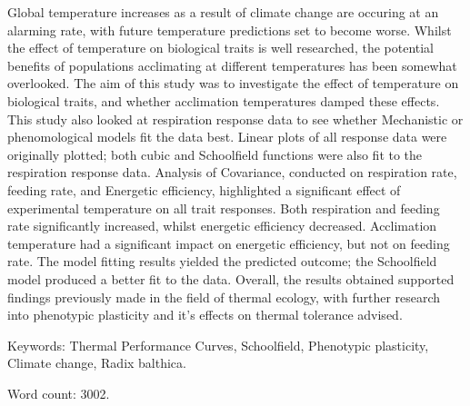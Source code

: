 \documentclass[../../Paper.tex]{subfiles}
\begin{document}
Global temperature increases as a result of climate change are occuring 
at an alarming rate, with future temperature predictions set
to become worse. Whilst the effect of temperature on biological
traits is well researched, the potential benefits of populations acclimating at different temperatures 
has been somewhat overlooked. The aim of this study was
to investigate the effect of temperature on biological traits,
and whether acclimation temperatures damped these effects.
This study also looked at respiration response data to see whether Mechanistic or
phenomological models fit the data best. Linear plots of all 
response data were originally plotted; both cubic and Schoolfield
functions were also fit to the respiration response
data. Analysis of Covariance, conducted on respiration rate, feeding rate, and
Energetic efficiency, highlighted a significant effect of experimental temperature
on all trait responses. Both respiration and feeding rate significantly increased, whilst energetic efficiency
decreased. Acclimation temperature had a significant impact on energetic efficiency, 
but not on feeding rate. The model fitting results yielded the predicted outcome; 
the Schoolfield model produced a better fit to the data. Overall, the results
obtained supported findings previously made in the field of thermal
ecology, with further research into phenotypic plasticity and it's effects on thermal
tolerance advised.
\vspace{1cm}

Keywords: Thermal Performance Curves, Schoolfield, Phenotypic plasticity, Climate change, Radix balthica. 


\vspace{3cm}
Word count: 3002. 
\newpage
\end{document}
